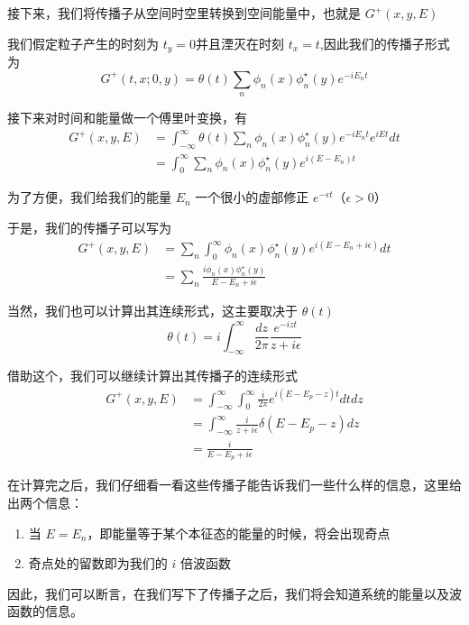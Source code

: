 接下来，我们将传播子从空间时空里转换到空间能量中，也就是 $G^{+}(x,y,E)$

我们假定粒子产生的时刻为 $t_y = 0$并且湮灭在时刻 $t_x = t$,因此我们的传播子形式为
\begin{equation*}
    G^{+}(t,x;0,y) = \theta(t) \sum_n \phi_n(x)\phi_n^\star(y)e^{-iE_n t}
\end{equation*}


接下来对时间和能量做一个傅里叶变换，有
\begin{align*}
    G^{+}(x,y,E) &= \int_{-\infty}^{\infty} \theta(t) \sum_n \phi_n(x)\phi_n^\star(y)e^{-iE_n t} e^{iEt} dt \\
    &= \int_{0}^{\infty}\sum_n \phi_n(x)\phi_n^\star(y)e^{i(E - E_n)t}
\end{align*}

为了方便，我们给我们的能量 $E_n$ 一个很小的虚部修正 $e^{-\epsilon t}$（$\epsilon > 0$）

于是，我们的传播子可以写为
\begin{align*}
    G^{+}(x,y,E) &= \sum_n \int_{0}^{\infty}\phi_n(x)\phi_n^\star(y)e^{i(E - E_n +i\epsilon)}dt \\
    &= \sum_n \frac{i\phi_n(x)\phi_n^\star(y)}{E - E_n +i\epsilon}
\end{align*}

当然，我们也可以计算出其连续形式，这主要取决于 $\theta(t)$
\begin{equation*}
    \theta(t) = i \int_{-\infty}^{\infty} \frac{dz}{2\pi}\frac{e^{-izt}}{z + i\epsilon}
\end{equation*}

借助这个，我们可以继续计算出其传播子的连续形式
\begin{align*}
    G^{+}(x,y,E) &= \int_{-\infty}^{\infty} \int_{0}^{\infty} \frac{i}{2\pi}e^{i(E - E_p -z)t} dt dz\\
    &= \int_{-\infty}^{\infty} \frac{i}{z + i \epsilon} \delta(E - E_p -z) dz \\
    &= \frac{i}{E - E_p + i\epsilon}
\end{align*}

在计算完之后，我们仔细看一看这些传播子能告诉我们一些什么样的信息，这里给出两个信息：
\begin{enumerate}
    \item 当 $E = E_n$，即能量等于某个本征态的能量的时候，将会出现奇点
    \item 奇点处的留数即为我们的 $i$ 倍波函数
\end{enumerate}

因此，我们可以断言，在我们写下了传播子之后，我们将会知道系统的能量以及波函数的信息。

